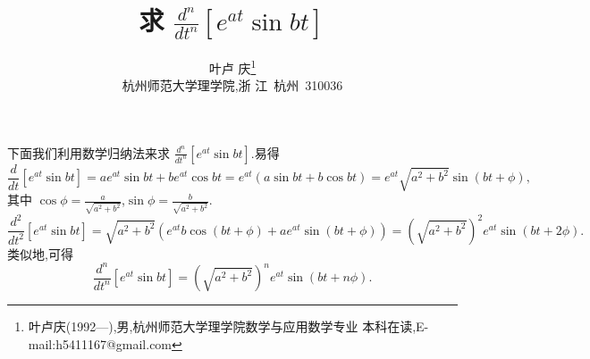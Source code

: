 \documentclass[a4paper]{article}
\begin{document}
\title{\huge{\bf{求 $\frac{d^n}{dt^n}[e^{at}\sin bt]$}}} \author{\small{叶卢
    庆\footnote{叶卢庆(1992---),男,杭州师范大学理学院数学与应用数学专业
      本科在读,E-mail:h5411167@gmail.com}}\\{\small{杭州师范大学理学院,浙
      江~杭州~310036}}}
\maketitle
下面我们利用数学归纳法来求 $\frac{d^n}{dt^n}[e^{at}\sin bt]$.易得
\begin{equation}
  \label{eq:1}
  \frac{d}{dt}[e^{at}\sin bt]=ae^{at}\sin bt+be^{at}\cos
  bt=e^{at}(a\sin bt+b\cos bt)=e^{at}\sqrt{a^2+b^2}\sin(bt+\phi),
\end{equation}
其中 $\cos \phi=\frac{a}{\sqrt{a^2+b^2}}$,$\sin\phi=\frac{b}{\sqrt{a^2+b^2}}$.
\begin{equation}
  \label{eq:2}
  \frac{d^2}{dt^2}[e^{at}\sin
  bt]=\sqrt{a^2+b^2}(e^{at}b\cos(bt+\phi)+ae^{at}\sin
  (bt+\phi))=(\sqrt{a^2+b^2})^2e^{at}\sin (bt+2\phi).
\end{equation}
类似地,可得
$$
\frac{d^n}{dt^n}[e^{at}\sin bt]=(\sqrt{a^2+b^2})^ne^{at}\sin (bt+n\phi).
$$
\end{document}
